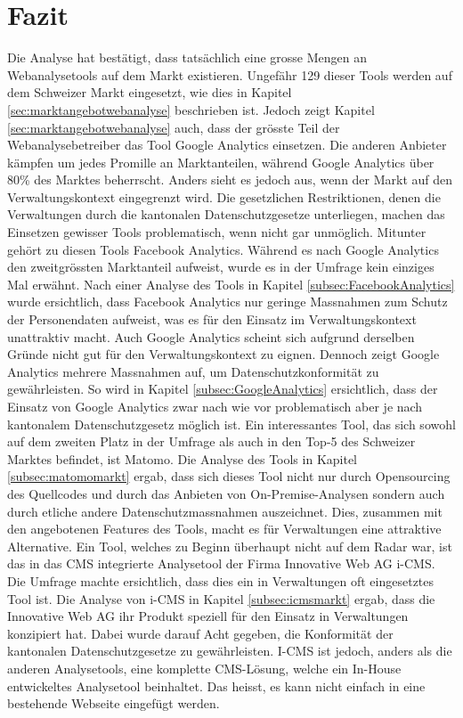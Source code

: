 \chapter{Fazit}
Die Analyse hat bestätigt, dass tatsächlich eine grosse Mengen an Webanalysetools auf dem Markt existieren. Ungefähr 129 dieser Tools werden auf dem Schweizer Markt eingesetzt, wie dies in Kapitel \ref{sec:marktangebotwebanalyse} beschrieben ist. Jedoch zeigt Kapitel \ref{sec:marktangebotwebanalyse} auch, dass der grösste Teil der Webanalysebetreiber das Tool Google Analytics einsetzen. Die anderen Anbieter kämpfen um jedes Promille an Marktanteilen, während Google Analytics über 80\% des Marktes beherrscht. Anders sieht es jedoch aus, wenn der Markt auf den Verwaltungskontext eingegrenzt wird. Die gesetzlichen Restriktionen, denen die Verwaltungen durch die kantonalen Datenschutzgesetze unterliegen, machen das Einsetzen gewisser Tools problematisch, wenn nicht gar unmöglich. Mitunter gehört zu diesen Tools Facebook Analytics. Während es nach Google Analytics den zweitgrössten Marktanteil aufweist, wurde es in der Umfrage kein einziges Mal erwähnt. Nach einer Analyse des Tools in Kapitel \ref{subsec:FacebookAnalytics} wurde ersichtlich, dass Facebook Analytics nur geringe Massnahmen zum Schutz der Personendaten aufweist, was es für den Einsatz im Verwaltungskontext unattraktiv macht. Auch Google Analytics scheint sich aufgrund derselben Gründe nicht gut für den Verwaltungskontext zu eignen. Dennoch zeigt Google Analytics mehrere Massnahmen auf, um Datenschutzkonformität zu gewährleisten. So wird in Kapitel \ref{subsec:GoogleAnalytics} ersichtlich, dass der Einsatz von Google Analytics zwar nach wie vor problematisch aber je nach kantonalem Datenschutzgesetz möglich ist. Ein interessantes Tool, das sich sowohl auf dem zweiten Platz in der Umfrage als auch in den Top-5 des Schweizer Marktes befindet, ist Matomo.
Die Analyse des Tools in Kapitel \ref{subsec:matomomarkt} ergab, dass sich dieses Tool nicht nur durch Opensourcing des Quellcodes und durch das Anbieten von On-Premise-Analysen sondern auch durch etliche andere Datenschutzmassnahmen auszeichnet. Dies, zusammen mit den angebotenen Features des Tools, macht es für Verwaltungen eine attraktive Alternative. Ein Tool, welches zu Beginn überhaupt nicht auf dem Radar war, ist das in das CMS integrierte Analysetool der Firma Innovative Web AG i-CMS. Die Umfrage machte ersichtlich, dass dies ein in Verwaltungen oft eingesetztes Tool ist. Die Analyse von i-CMS in Kapitel \ref{subsec:icmsmarkt} ergab, dass die Innovative Web AG ihr Produkt speziell für den Einsatz in Verwaltungen konzipiert hat. Dabei wurde darauf Acht gegeben, die Konformität der kantonalen Datenschutzgesetze zu gewährleisten. I-CMS ist jedoch, anders als die anderen Analysetools, eine komplette CMS-Lösung, welche ein In-House entwickeltes Analysetool beinhaltet. Das heisst, es kann nicht einfach in eine bestehende Webseite eingefügt werden. 


